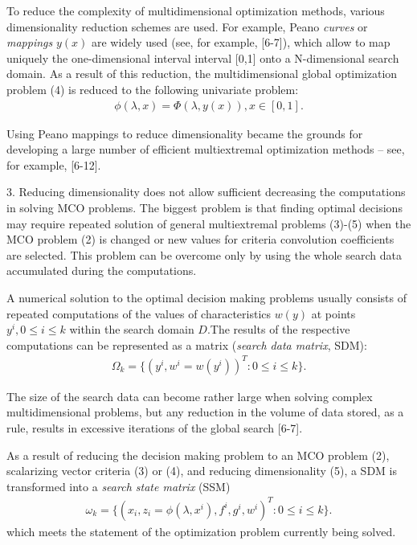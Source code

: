 \documentclass{aip-cp}
\begin{document}
To reduce the complexity of multidimensional optimization methods, various dimensionality reduction schemes are used. For example, Peano {\it curves} or {\it mappings} $y(x)$ are widely used (see, for example, [6-7]), which allow to map uniquely the one-dimensional interval interval [0,1] onto a N-dimensional search domain. As a result of this reduction, the multidimensional global optimization problem (4) is reduced to the following univariate problem:
\begin{eqnarray}
\phi(\lambda, x) = \Phi(\lambda, y(x)), x \in [0, 1].
\end{eqnarray}

Using Peano mappings to reduce dimensionality became the grounds for developing a large number of efficient multiextremal optimization methods – see, for example, [6-12]. \par
3. Reducing dimensionality does not allow sufficient decreasing the computations in solving MCO problems. The biggest problem is that finding optimal decisions may require repeated solution of general multiextremal problems (3)-(5) when the MCO problem (2) is changed or new values for criteria convolution coefficients are selected. This problem can be overcome only by using the whole search data accumulated during the computations. \par
	
A numerical solution to the optimal decision making problems usually consists of repeated computations of the values of characteristics $w(y)$ at points $y^i,0 \leq i \leq k$ within the search domain $D$.The results of the respective computations can be represented as a matrix ({\it search data matrix}, SDM):
\begin{eqnarray*}
\Omega_k = \{ (y^i,w^i=w(y^i ))^T :0 \leq i \leq k \}.
\end{eqnarray*}

The size of the search data can become rather large when solving complex multidimensional problems, but any reduction in the volume of data stored, as a rule, results in excessive iterations of the global search [6-7]. \par

As a result of reducing the decision making problem to an MCO problem (2), scalarizing vector criteria (3) or (4), and reducing dimensionality (5), a SDM is transformed into a {\it search state matrix} (SSM) 
\begin{eqnarray*}
\omega_k=\{ (x_i,z_i = \phi(\lambda, x^i), f^i, g^i, w^i)^T:0 \leq i \leq k\}.
\end{eqnarray*}
which meets the statement of the optimization problem currently being solved. \par
\end{document}
